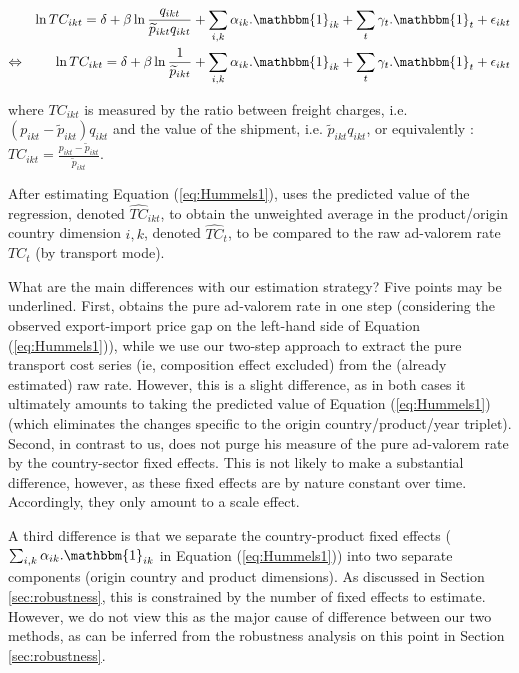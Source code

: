 \documentclass[a4paper,11pt]{article}
\begin{document}
\begin{eqnarray}
&&\ln TC_{ikt} = \delta+ \beta \ln \frac{q_{ikt}}{\widetilde{p}_{ikt}q_{ikt}} + \sum_{i,k}\alpha_{ik}.\mathbbm{1}_{ik}+ \sum_{t}\gamma_{t}.\mathbbm{1}_{t} + \epsilon_{ikt} \notag \\
\Leftrightarrow && \ln TC_{ikt} = \delta+ \beta \ln \frac{1}{\widetilde{p}_{ikt}} + \sum_{i,k}\alpha_{ik}.\mathbbm{1}_{ik}+ \sum_{t}\gamma_{t}.\mathbbm{1}_{t} + \epsilon_{ikt} \label{eq:Hummels1}
\end{eqnarray}

\noindent where $TC_{ikt}$ is measured by the ratio between freight charges, i.e.
$(p_{ikt} - \widetilde{p}_{ikt})q_{ikt}$ and the value of the shipment, i.e.
$\widetilde{p}_{ikt}q_{ikt}$, or equivalently : $TC_{ikt} = \frac{p_{ikt} - \widetilde{p}_{ikt}}{\widetilde{p}_{ikt}}$.\medskip

After estimating Equation (\ref{eq:Hummels1}), \cite{hummels2007} uses the predicted value of the regression, denoted $\widehat{TC}_{ikt}$, to obtain the unweighted average in the product/origin country dimension $i,k$, denoted $\widehat{TC}_{t}$, to be compared to the raw ad-valorem rate $TC_{t}$ (by transport mode).\medskip

What are the main differences with our estimation strategy? Five points may be underlined.
First, \cite{hummels2007} obtains the pure ad-valorem rate in one step (considering the observed export-import price gap on the left-hand side of Equation (\ref{eq:Hummels1})), while we use our two-step approach to extract the pure transport cost series (ie, composition effect excluded) from the (already estimated) raw rate.
However, this is a slight difference, as in both cases it ultimately amounts to taking the predicted value of Equation (\ref{eq:Hummels1}) (which eliminates the changes specific to the origin country/product/year triplet).
Second, in contrast to us, \cite{hummels2007} does not purge his measure of the pure ad-valorem rate by the country-sector fixed effects.
This is not likely to make a substantial difference, however, as these fixed effects are by nature constant over time. Accordingly, they only amount to a scale effect.

A third difference is that we separate the country-product fixed effects ($\sum_{i,k}\alpha_{ik}.\mathbbm{1}_{ik}$ in Equation (\ref{eq:Hummels1})) into two separate components (origin country and product dimensions).
As discussed in Section \ref{sec:robustness}, this is constrained by the number of fixed effects to estimate.
However, we do not view this as the major cause of difference between our two methods, as can be inferred from the robustness analysis on this point in Section \ref{sec:robustness}.
\end{document}
